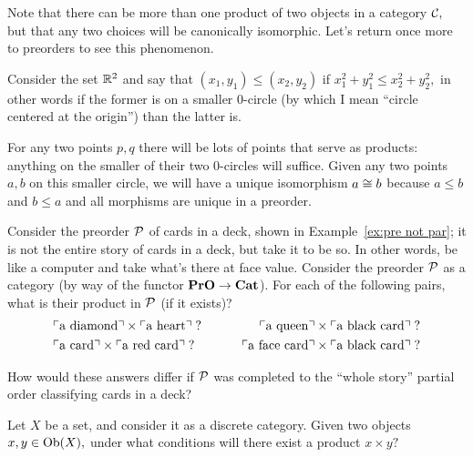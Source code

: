\documentclass[../main/CT4S-EN-RU]{subfiles}
\begin{document}
\begin{exampleENG}
Note that there can be more than one product of two objects in a category $\mathcal{C},$ but that any two choices will be canonically isomorphic. Let's return once more to preorders to see this phenomenon.

Consider the set ${\mathbb R}^2$ and say that $(x_1,y_1)\leq (x_2,y_2)$ if $x_1^2+y_1^2\leq x_2^2+y_2^2,$ in other words if the former is on a smaller 0-circle (by which I mean “circle centered at the origin”) than the latter is. 

For any two points $p,q$ there will be lots of points that serve as products: anything on the smaller of their two 0-circles will suffice. Given any two points $a,b$ on this smaller circle, we will have a unique isomorphism $a\cong b$ because $a\leq b$ and $b\leq a$ and all morphisms are unique in a preorder.
\end{exampleENG}

\begin{exampleRUS}
\end{exampleRUS}

\begin{exerciseENG}
Consider the preorder $\mathcal{P}$ of cards in a deck, shown in Example~\ref{ex:pre not par}; it is not the entire story of cards in a deck, but take it to be so. In other words, be like a computer and take what's there at face value. Consider the preorder $\mathcal{P}$ as a category (by way of the functor ${\mathbf{PrO}}\rightarrow{\mathbf{Cat}}$).
\sexc For each of the following pairs, what is their product in $\mathcal{P}$ (if it exists)?
\begin{align*}
&\textnormal{$\ulcorner$a diamond$\urcorner$}\times\textnormal{$\ulcorner$a heart$\urcorner$}\;? \hspace{.3in} &\textnormal{$\ulcorner$a queen$\urcorner$}\times\textnormal{$\ulcorner$a black card$\urcorner$}\;?\\
& \textnormal{$\ulcorner$a card$\urcorner$}\times\textnormal{$\ulcorner$a red card$\urcorner$}\;?\hspace{.3in}&\textnormal{$\ulcorner$a face card$\urcorner$}\times\textnormal{$\ulcorner$a black card$\urcorner$}\;?
\end{align*}
\item How would these answers differ if $\mathcal{P}$ was completed to the “whole story” partial order classifying cards in a deck?
\endsexc
\end{exerciseENG}

\begin{exerciseRUS}
\end{exerciseRUS}

\begin{exerciseENG}
Let $X$ be a set, and consider it as a discrete category. Given two objects $x,y\in\operatorname{Ob}(X),$ under what conditions will there exist a product $x\times y?$
\end{exerciseENG}
\end{document}
